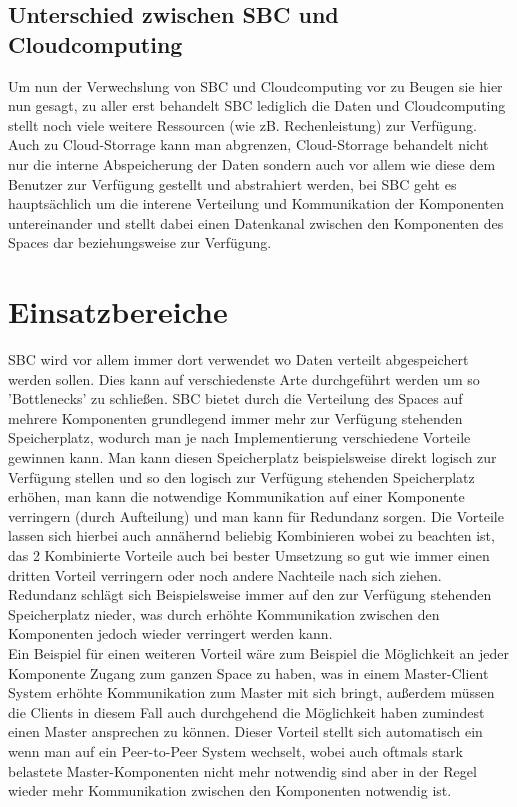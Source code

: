 \documentclass[a4paper,12pt]{scrreprt}
\begin{document}
		
		\subsection{Unterschied zwischen SBC und Cloudcomputing}
			Um nun der Verwechslung von SBC und Cloudcomputing vor zu Beugen sie hier nun gesagt, zu aller erst behandelt SBC lediglich die Daten und Cloudcomputing stellt noch viele weitere Ressourcen (wie zB. Rechenleistung) zur Verfügung. Auch zu Cloud-Storrage kann man abgrenzen, Cloud-Storrage behandelt nicht nur die interne Abspeicherung der Daten sondern auch vor allem wie diese dem Benutzer zur Verfügung gestellt und abstrahiert werden, bei SBC geht es hauptsächlich um die interene Verteilung und Kommunikation der Komponenten untereinander und stellt dabei einen Datenkanal zwischen den Komponenten des Spaces dar beziehungsweise zur Verfügung. 
			
	\section{Einsatzbereiche}
		SBC wird vor allem immer dort verwendet wo Daten verteilt abgespeichert werden sollen. Dies kann auf verschiedenste Arte durchgeführt werden um so 'Bottlenecks' %
		zu schließen. SBC bietet durch die Verteilung des Spaces auf mehrere Komponenten grundlegend immer mehr zur Verfügung stehenden Speicherplatz, wodurch man je nach Implementierung verschiedene Vorteile gewinnen kann. Man kann diesen Speicherplatz beispielsweise direkt logisch zur Verfügung stellen und so den logisch zur Verfügung stehenden Speicherplatz erhöhen, man kann die notwendige  Kommunikation auf einer Komponente verringern (durch Aufteilung) und man kann für Redundanz sorgen. Die Vorteile lassen sich hierbei auch annähernd beliebig Kombinieren wobei zu beachten ist, das 2 Kombinierte Vorteile auch bei bester Umsetzung so gut wie immer einen dritten Vorteil verringern oder noch andere Nachteile nach sich ziehen. Redundanz schlägt sich Beispielsweise immer auf den zur Verfügung stehenden Speicherplatz nieder, was durch erhöhte Kommunikation zwischen den Komponenten jedoch wieder verringert werden kann. \\    Ein Beispiel für einen weiteren Vorteil wäre zum Beispiel die Möglichkeit an jeder Komponente Zugang zum ganzen Space zu haben, was in einem Master-Client System erhöhte Kommunikation zum Master mit sich bringt, außerdem müssen die Clients in diesem Fall auch durchgehend die Möglichkeit haben zumindest einen Master ansprechen zu können. Dieser Vorteil stellt sich automatisch ein wenn man auf ein Peer-to-Peer System wechselt, wobei auch oftmals stark belastete Master-Komponenten nicht mehr notwendig sind aber in der Regel wieder mehr Kommunikation zwischen den Komponenten notwendig ist.
\end{document}
